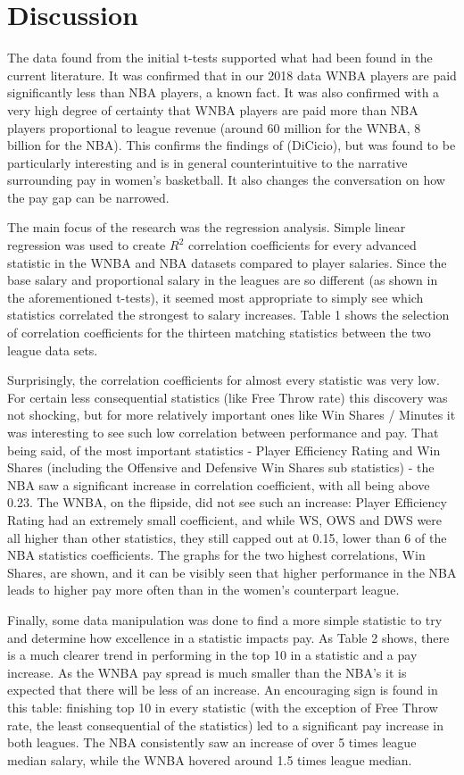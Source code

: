 \documentclass[12pt]{article}
\begin{document}
\section{Discussion}
The data found from the initial t-tests supported what had been found in the current literature. It was confirmed that in our 2018 data WNBA players are paid significantly less than NBA players, a known fact. It was also confirmed with a very high degree of certainty that WNBA players are paid more than NBA players proportional to league revenue (around 60 million for the WNBA, 8 billion for the NBA). This confirms the findings of (DiCicio), but was found to be particularly interesting and is in general counterintuitive to the narrative surrounding pay in women’s basketball. It also changes the conversation on how the pay gap can be narrowed.
\par
The main focus of the research was the regression analysis. Simple linear regression was used to create $R^2$ correlation coefficients for every advanced statistic in the WNBA and NBA datasets compared to player salaries. Since the base salary and proportional salary in the leagues are so different (as shown in the aforementioned t-tests), it seemed most appropriate to simply see which statistics correlated the strongest to salary increases. Table 1 shows the selection of correlation coefficients for the thirteen matching statistics between the two league data sets.
\par
Surprisingly, the correlation coefficients for almost every statistic was very low. For certain less consequential statistics (like Free Throw rate) this discovery was not shocking, but for more relatively important ones like Win Shares / Minutes it was interesting to see such low correlation between performance and pay. That being said, of the most important statistics - Player Efficiency Rating and Win Shares (including the Offensive and Defensive Win Shares sub statistics) - the NBA saw a significant increase in correlation coefficient, with all being above 0.23. The WNBA, on the flipside, did not see such an increase: Player Efficiency Rating had an extremely small coefficient, and while WS, OWS and DWS were all higher than other statistics, they still capped out at 0.15, lower than 6 of the NBA statistics coefficients. The graphs for the two highest correlations, Win Shares, are shown, and it can be visibly seen that higher performance in the NBA leads to higher pay more often than in the women’s counterpart league.
\par
Finally, some data manipulation was done to find a more simple statistic to try and determine how excellence in a statistic impacts pay. As Table 2 shows, there is a much clearer trend in performing in the top 10 in a statistic and a pay increase. As the WNBA pay spread is much smaller than the NBA’s it is expected that there will be less of an increase. An encouraging sign is found in this table: finishing top 10 in every statistic (with the exception of Free Throw rate, the least consequential of the statistics) led to a significant pay increase in both leagues. The NBA consistently saw an increase of over 5 times league median salary, while the WNBA hovered around 1.5 times league median.
\end{document}
